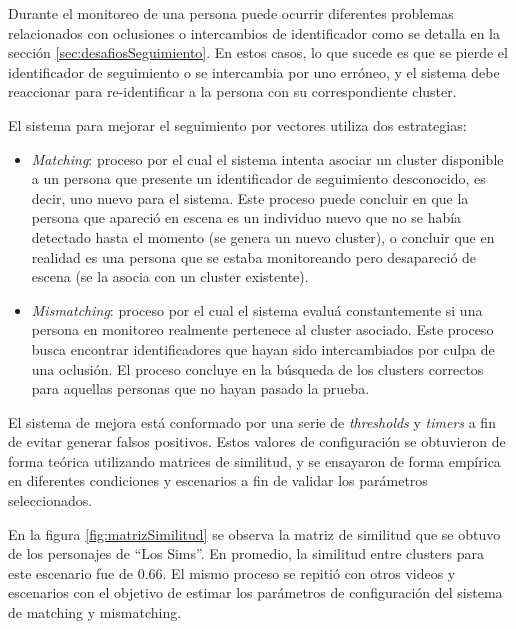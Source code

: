 Durante el monitoreo de una persona puede ocurrir diferentes problemas relacionados con oclusiones o intercambios de identificador como se detalla en la sección \ref{sec:desafiosSeguimiento}. En estos casos, lo que sucede es que se pierde el identificador de seguimiento o se intercambia por uno erróneo, y el sistema debe reaccionar para re-identificar a la persona con su correspondiente cluster. 

\newpage

El sistema para mejorar el seguimiento por vectores utiliza dos estrategias:
\begin{itemize}
\item \textit{Matching}: proceso por el cual el sistema intenta asociar un cluster disponible a un persona que presente un identificador de seguimiento desconocido, es decir, uno nuevo para el sistema. Este proceso puede concluir en que la persona que apareció en escena es un individuo nuevo que no se había detectado hasta el momento (se genera un nuevo cluster), o concluir que en realidad es una persona que se estaba monitoreando pero desapareció de escena (se la asocia con un cluster existente).
\item \textit{Mismatching}: proceso por el cual el sistema evaluá constantemente si una persona en monitoreo realmente pertenece al cluster asociado. Este proceso busca encontrar identificadores que hayan sido intercambiados por culpa de una oclusión. El proceso concluye en la búsqueda de los clusters correctos para aquellas personas que no hayan pasado la prueba.
\end{itemize}

El sistema de mejora está conformado por una serie de \textit{thresholds} y \textit{timers} a fin de evitar generar falsos positivos. Estos valores de configuración se obtuvieron de forma teórica utilizando matrices de similitud, y se ensayaron de forma empírica en diferentes condiciones y escenarios a fin de validar los parámetros seleccionados.

En la figura \ref{fig:matrizSimilitud} se observa la matriz de similitud que se obtuvo de los personajes de ``Los Sims''. En promedio, la similitud entre clusters para este escenario fue de 0.66. El mismo proceso se repitió con otros videos y escenarios con el objetivo de estimar los parámetros de configuración del sistema de matching y mismatching.

